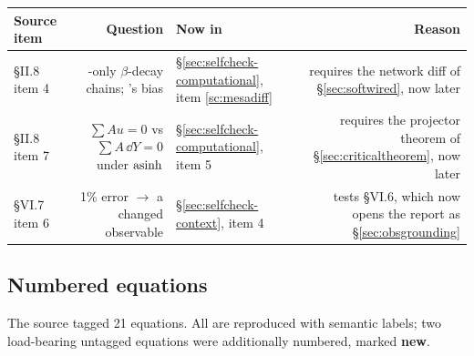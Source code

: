 \begin{center}
\small
\begin{tabularx}{\textwidth}{@{}l R{0.95} l R{1.05}@{}}
\toprule
\textbf{Source item} & \textbf{Question} & \textbf{Now in} &
\textbf{Reason} \\
\midrule
\S II.8 item 4 &
  -only $\beta$-decay chains; 's \Ye{} bias &
  \S\ref{sec:selfcheck-computational}, item \ref{sc:mesadiff} &
  requires the network diff of \S\ref{sec:softwired}, now later \\
\S II.8 item 7 &
  $\sum A u = 0$ vs $\sum A\,\dd Y = 0$ under $\operatorname{asinh}$ &
  \S\ref{sec:selfcheck-computational}, item 5 &
  requires the projector theorem of \S\ref{sec:criticaltheorem}, now later \\
\S VI.7 item 6 &
  1\% \Ye{} error $\to$ a changed observable &
  \S\ref{sec:selfcheck-context}, item 4 &
  tests \S VI.6, which now opens the report as \S\ref{sec:obsgrounding} \\
\bottomrule
\end{tabularx}
\end{center}

\subsection{Numbered equations}

The source tagged 21 equations. All are reproduced with semantic labels; two
load-bearing untagged equations were additionally numbered, marked \textbf{new}.

